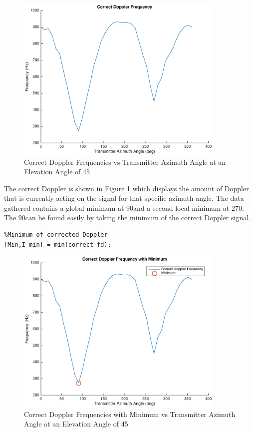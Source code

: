 \begin{figure}
	\begin{center}
		\includegraphics[width=10cm]{images/results/Correct_doppler.eps}
		\caption{Correct Doppler Frequencies vs Transmitter Azimuth Angle at an Elevation Angle of 45\textdegree}
		\label{fig:correct_fd}
	\end{center}
\end{figure}

The correct Doppler is shown in Figure \ref{fig:correct_fd} which displays the amount of Doppler that is currently acting on the signal for that specific azimuth angle. The data gathered contains a global minimum at 90\textdegree \space and a second local minimum at 270\textdegree. The 90\textdegree \space can be found easily by taking the minimum of the correct Doppler signal.

\begin{lstlisting}
%Minimum of corrected Doppler
[Min,I_min] = min(correct_fd);
\end{lstlisting}

\begin{figure}
	\begin{center}
		\includegraphics[width=10cm]{images/results/Correct_doppler_with_Minumum.eps}
		\caption{Correct Doppler Frequencies with Minimum vs Transmitter Azimuth Angle at an Elevation Angle of 45\textdegree}
		\label{fig:min_correct_fd}
	\end{center}
\end{figure}

